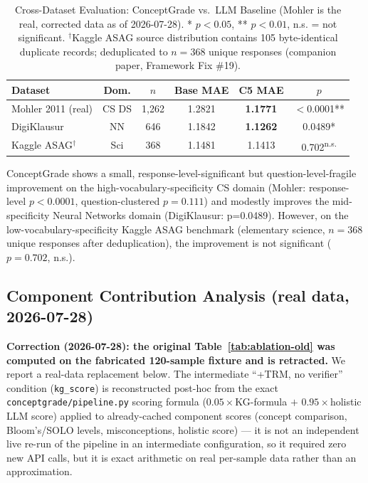 \documentclass[journal,review]{vgtc}
\begin{document}
\begin{table}[ht]
\centering
\caption{Cross-Dataset Evaluation: ConceptGrade vs.\ LLM Baseline (Mohler is the real, corrected data as of 2026-07-28). * $p<0.05$, ** $p<0.01$, n.s. = not significant.
$^{\dagger}$Kaggle ASAG source distribution contains 105 byte-identical duplicate records; deduplicated to $n=368$ unique responses (companion paper, Framework Fix \#19).}
\label{tab:multidataset}
\small
\begin{tabular}{lccccc}
\toprule
\textbf{Dataset} & \textbf{Dom.} & \textbf{$n$} & \textbf{Base MAE} & \textbf{C5 MAE} & \textbf{$p$} \\
\midrule
Mohler 2011 (real) & CS DS & 1{,}262 & 1.2821 & \textbf{1.1771} & $<$0.0001** \\
DigiKlausur & NN & 646 & 1.1842 & \textbf{1.1262} & 0.0489* \\
Kaggle ASAG$^{\dagger}$ & Sci & 368 & 1.1481 & 1.1413 & 0.702\textsuperscript{n.s.} \\
\bottomrule
\end{tabular}
\end{table}

ConceptGrade shows a small, response-level-significant but question-level-fragile improvement on the high-vocabulary-specificity CS domain (Mohler: response-level $p<0.0001$, question-clustered $p=0.111$) and modestly improves the mid-specificity Neural Networks domain (DigiKlausur: p=0.0489). However, on the low-vocabulary-specificity Kaggle ASAG benchmark (elementary science, $n=368$ unique responses after deduplication), the improvement is not significant ($p=0.702$, n.s.).

\subsection{Component Contribution Analysis (real data, 2026-07-28)}

\textbf{Correction (2026-07-28): the original Table~\ref{tab:ablation-old} was computed
on the fabricated 120-sample fixture and is retracted.} We report a
real-data replacement below. The intermediate ``+TRM, no verifier''
condition (\texttt{kg\_score}) is reconstructed post-hoc from the exact
\texttt{conceptgrade/pipeline.py} scoring formula ($0.05\!\times\!$KG-formula $+$
$0.95\!\times\!$holistic LLM score) applied to already-cached component
scores (concept comparison, Bloom's/SOLO levels, misconceptions,
holistic score) --- it is not an independent live re-run of the
pipeline in an intermediate configuration, so it required zero new API
calls, but it is exact arithmetic on real per-sample data rather than an
approximation.
\end{document}
